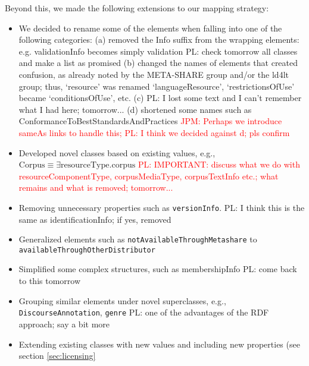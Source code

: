 \documentclass{llncs}
\begin{document}
{Beyond this, we made the following extensions to our mapping strategy:
\begin{itemize}
\item We decided to rename some of the elements when falling into one of the following categories:
(a) removed the Info suffix from the wrapping elements: e.g. validationInfo becomes simply validation {PL: check tomorrow all classes and make a list as promised}
(b) changed the names of elements that created confusion, as already noted by
the META-SHARE group and/or the ld4lt group; thus, `resource' was renamed
`languageResource', `restrictionsOfUse' became `conditionsOfUse', etc.
(c) {PL: I lost some text and I can't remember what I had here; tomorrow...}
(d) shortened some names such as ConformanceToBestStandardsAndPractices
\textcolor{red}{JPM: Perhaps we introduce sameAs links to handle this; PL: I think we decided against d; pls confirm}
\item Developed novel classes based on existing values, e.g.,
$\mathrm{Corpus} \equiv \exists \mathrm{resourceType}.\mathrm{corpus}$
\textcolor{red}{PL: IMPORTANT: discuss what we do with resourceComponentType, corpusMediaType, corpusTextInfo etc.; what remains and what is removed; tomorrow...}
\item Removing unnecessary properties such as {\tt versionInfo}.
{PL: I think this is the same as identificationInfo; if yes, removed}
\item Generalized elements such as {\tt notAvailableThroughMetashare} to {\tt availableThroughOtherDistributor}
\item Simplified some complex structures, such as membershipInfo
{PL: come back to this tomorrow}
\item Grouping similar elements under novel superclasses, e.g., {\tt DiscourseAnnotation}, {\tt genre}
{PL: one of the advantages of the RDF approach; say a bit more}
\item Extending existing classes with new values and including new properties (see section \ref{sec:licensing}
\end{itemize}
}
\end{document}
